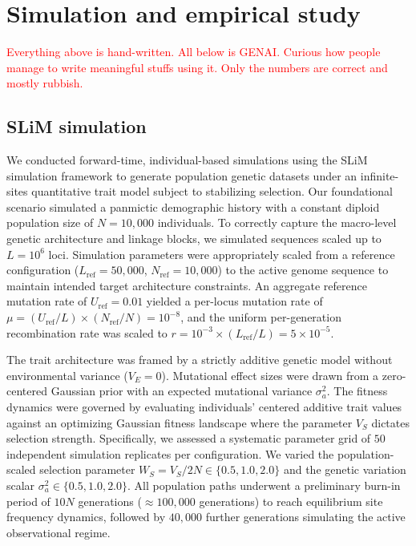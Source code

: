 \documentclass[10pt]{article}
\begin{document}
\section{Simulation and empirical study}


\textcolor{red}{Everything above is hand-written. All below is GENAI. Curious how people manage to write meaningful stuffs using it. Only the numbers are correct and mostly rubbish.}

\subsection{SLiM simulation}
We conducted forward-time, individual-based simulations using the SLiM simulation framework to generate population genetic datasets under an infinite-sites quantitative trait model subject to stabilizing selection. Our foundational scenario simulated a panmictic demographic history with a constant diploid population size of $N=10{,}000$ individuals. To correctly capture the macro-level genetic architecture and linkage blocks, we simulated sequences scaled up to $L=10^6$ loci. Simulation parameters were appropriately scaled from a reference configuration ($L_{\text{ref}}=50{,}000$, $N_{\text{ref}}=10{,}000$) to the active genome sequence to maintain intended target architecture constraints. An aggregate reference mutation rate of $U_{\text{ref}} = 0.01$ yielded a per-locus mutation rate of $\mu = (U_{\text{ref}}/L) \times (N_{\text{ref}}/N) = 10^{-8}$, and the uniform per-generation recombination rate was scaled to $r = 10^{-3} \times (L_{\text{ref}}/L) = 5 \times 10^{-5}$.

The trait architecture was framed by a strictly additive genetic model without environmental variance ($V_E = 0$). Mutational effect sizes were drawn from a zero-centered Gaussian prior with an expected mutational variance $\sigma_a^2$. The fitness dynamics were governed by evaluating individuals' centered additive trait values against an optimizing Gaussian fitness landscape where the parameter $V_S$ dictates selection strength. Specifically, we assessed a systematic parameter grid of $50$ independent simulation replicates per configuration. We varied the population-scaled selection parameter $W_S = V_S / 2N \in \{0.5, 1.0, 2.0\}$ and the genetic variation scalar $\sigma_a^2 \in \{0.5, 1.0, 2.0\}$. All population paths underwent a preliminary burn-in period of $10N$ generations ($\approx 100{,}000$ generations) to reach equilibrium site frequency dynamics, followed by $40{,}000$ further generations simulating the active observational regime.
\end{document}

